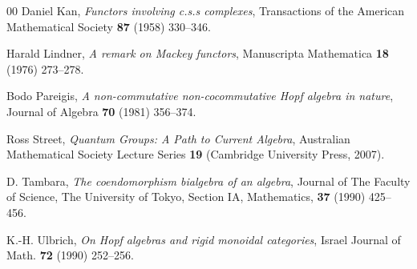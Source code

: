 \documentclass[a4paper,12pt,reqno]{amsart}
\theoremstyle{definition}
\theoremstyle{fact}
\theoremstyle{genquest}
\theoremstyle{step}
\begin{document}
\begin{thebibliography}{00}
 Daniel Kan, \textit{Functors involving c.s.s complexes}, Transactions of the American Mathematical Society \textbf{87} (1958) 330--346.\label{Kan}

 Harald Lindner, \textit{A remark on Mackey functors}, Manuscripta Mathematica \textbf{18} (1976) 273--278.\label{Lindner1976}

 Bodo Pareigis, \textit{A non-commutative non-cocommutative Hopf algebra in nature}, Journal of Algebra \textbf{70} (1981) 356--374.\label{NHA}

 Ross Street, \textit{Quantum Groups: A Path to Current Algebra}, Australian Mathematical Society Lecture Series \textbf{19} (Cambridge University Press, 2007).\label{QG} 

 D. Tambara, \textit{The coendomorphism bialgebra of an algebra}, Journal of The Faculty of Science, The University of Tokyo, Section IA, Mathematics, \textbf{37} (1990) 425--456.\label{CBA}

 K.-H. Ulbrich, \textit{On Hopf algebras and rigid monoidal categories}, Israel Journal of 
Math. \textbf{72} (1990) 252--256.\label{Ulbrich}

\end{thebibliography}
\end{document}
